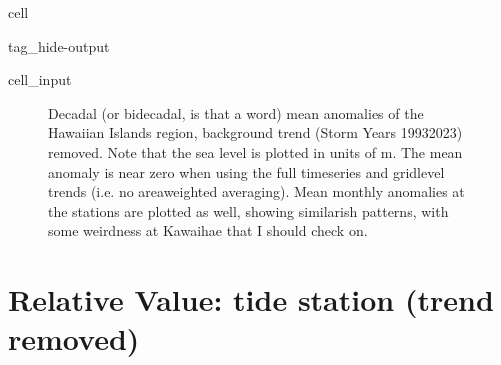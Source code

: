 \documentclass[letterpaper,10pt,english]{jupyterBook}
\begin{document}
\begin{sphinxuseclass}{cell}
\begin{sphinxuseclass}{tag_hide-output}
\begin{sphinxVerbatimInput}
\begin{sphinxuseclass}{cell_input}
\begin{sphinxVerbatim}[commandchars=\\\{\}]
       
       
    



   


\end{sphinxVerbatim}

\end{sphinxuseclass}\end{sphinxVerbatimInput}

\end{sphinxuseclass}
\end{sphinxuseclass}
\begin{figure}[htbp]
\centering
\capstart

\noindent{}
\caption{Decadal (or bidecadal, is that a word) mean anomalies of the Hawaiian Islands region, background trend (Storm Years 1993\sphinxhyphen{}2023) removed. Note that the sea level is plotted in units of m. The mean anomaly is near zero when using the full timeseries and grid\sphinxhyphen{}level trends (i.e. no area\sphinxhyphen{}weighted averaging). Mean monthly anomalies at the stations are plotted as well, showing similar\sphinxhyphen{}ish patterns, with some weirdness at Kawaihae that I should check on.}\label{\detokenize{notebooks/regional_and_local/SL_anomaly_annual:sl-yma-decadal}}\end{figure}


\part{Relative Value: tide station (trend removed)}
\label{\detokenize{notebooks/regional_and_local/SL_anomaly_annual:relative-value-tide-station-trend-removed}}
\end{document}
